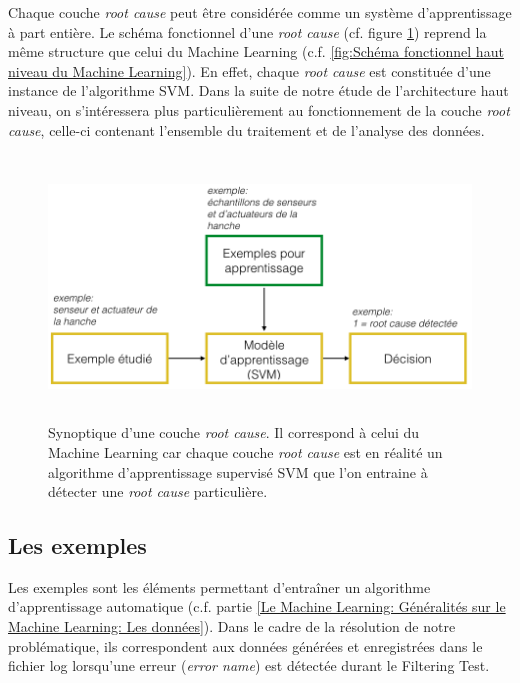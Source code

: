 Chaque couche \emph{root cause} peut être considérée comme un système d'apprentissage à part entière. Le schéma fonctionnel d'une \emph{root cause} (cf. figure 	\ref{fig:Synoptique d'une couche root cause}) reprend la même structure que celui du Machine Learning (c.f. \ref{fig:Schéma fonctionnel haut niveau du Machine Learning}). En effet, chaque \emph{root cause} est constituée d'une instance de l'algorithme SVM. Dans la suite de notre étude de l'architecture haut niveau, on s'intéressera plus particulièrement  au fonctionnement de la couche \emph{root cause}, celle-ci contenant l'ensemble du traitement et de l'analyse des données.

\begin{figure}[h]
	\centering\includegraphics[height=7cm]{images/exemple_root.png}
	\caption[Synoptique d'une couche root cause]{Synoptique d'une couche \emph{root cause}. Il correspond à celui du Machine Learning car chaque couche \emph{root cause} est en réalité un algorithme d'apprentissage supervisé SVM que l'on entraine à détecter une \emph{root cause} particulière.}
	\label{fig:Synoptique d'une couche root cause}
\end{figure}

\subsection{Les exemples}
\label{Automatisation du processus d'investigation: Achitecture High Level du système proposé: Les exemples}
Les exemples sont les éléments permettant d'entraîner un algorithme d'apprentissage automatique (c.f. partie \ref{Le Machine Learning: Généralités sur le Machine Learning: Les données}). Dans le cadre de la résolution de notre problématique, ils correspondent aux données générées et enregistrées dans le fichier log lorsqu'une erreur (\emph{error name}) est détectée durant le Filtering Test.

